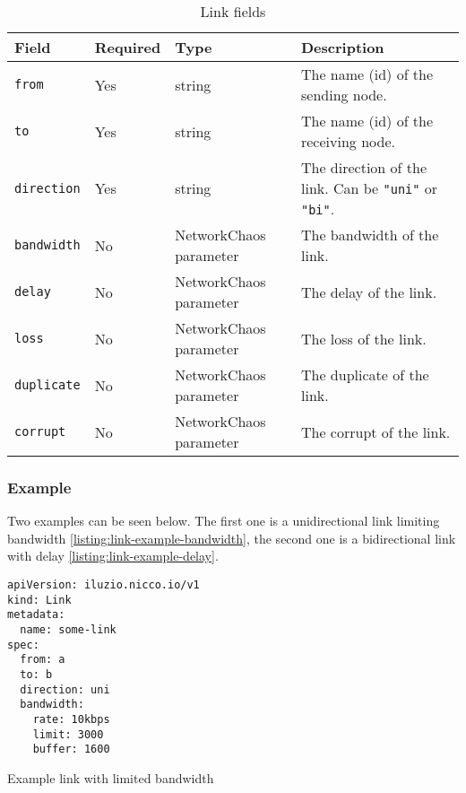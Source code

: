 \begin{table}[H]
  \centering
  \begin{tabular}{|l|l|l|l|}
    \hline
    \textbf{Field}   & \textbf{Required} & \textbf{Type}          & \textbf{Description}                                           \\
    \hline\hline
    \verb|from|      & Yes               & string                 & The name (id) of the sending node.                             \\ \hline
    \verb|to|        & Yes               & string                 & The name (id) of the receiving node.                           \\ \hline
    \verb|direction| & Yes               & string                 & The direction of the link. Can be \verb|"uni"| or \verb|"bi"|. \\ \hline
    \verb|bandwidth| & No                & NetworkChaos parameter & The bandwidth of the link.                                     \\ \hline
    \verb|delay|     & No                & NetworkChaos parameter & The delay of the link.                                         \\ \hline
    \verb|loss|      & No                & NetworkChaos parameter & The loss of the link.                                          \\ \hline
    \verb|duplicate| & No                & NetworkChaos parameter & The duplicate of the link.                                     \\ \hline
    \verb|corrupt|   & No                & NetworkChaos parameter & The corrupt of the link.                                       \\ \hline
  \end{tabular}
  \caption{Link fields}
  \label{tab:link-fields}
\end{table}

\subsubsection{Example}

Two examples can be seen below. The first one is a unidirectional link limiting bandwidth \ref{listing:link-example-bandwidth}, the second one is a bidirectional link with delay \ref{listing:link-example-delay}.

\begin{listing}[H]
  \begin{verbatim}
apiVersion: iluzio.nicco.io/v1
kind: Link
metadata:
  name: some-link
spec:
  from: a
  to: b
  direction: uni
  bandwidth:
    rate: 10kbps
    limit: 3000
    buffer: 1600
  \end{verbatim}
  \caption{Example link with limited bandwidth}
  \label{listing:link-example-bandwidth}
\end{listing}

